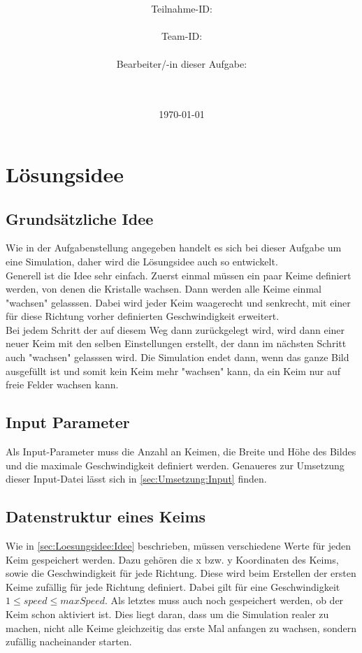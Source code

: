 \documentclass[a4paper,10pt,ngerman]{scrartcl}
\title{\textbf{\Huge\Aufgabe}}
\author{\LARGE Teilnahme-ID: \LARGE \TeilnahmeId \\\\
      \LARGE Team-ID: \LARGE \TeamId \\\\
	    \LARGE Bearbeiter/-in dieser Aufgabe: \\ 
	    \LARGE \Name\\\\}
\date{\LARGE\today}
\begin{document}
  \maketitle
  \tableofcontents
  \vspace{8cm}
  \section{Lösungsidee\label{sec:Loesungsidee}}
    \subsection{Grundsätzliche Idee\label{sec:Loesungsidee:Idee}}
      Wie in der Aufgabenstellung angegeben handelt es sich bei dieser Aufgabe um eine Simulation, daher wird die Lösungsidee auch so entwickelt.\\
      Generell ist die Idee sehr einfach. Zuerst einmal müssen ein paar Keime definiert werden, von denen die Kristalle wachsen. Dann werden alle Keime einmal "wachsen" gelasssen. Dabei wird jeder Keim waagerecht und senkrecht, mit einer für diese Richtung vorher definierten Geschwindigkeit erweitert. \\
      Bei jedem Schritt der auf diesem Weg dann zurückgelegt wird, wird dann einer neuer Keim mit den selben Einstellungen erstellt, der dann im nächsten Schritt auch "wachsen" gelasssen wird. Die Simulation endet dann, wenn das ganze Bild ausgefüllt ist und somit kein Keim mehr "wachsen" kann, da ein Keim nur auf freie Felder wachsen kann.
    \subsection{Input Parameter\label{sec:Loesungsidee:Parameter}}
      Als Input-Parameter muss die Anzahl an Keimen, die Breite und Höhe des Bildes und die maximale Geschwindigkeit definiert werden. Genaueres zur Umsetzung dieser Input-Datei lässt sich in \cref{sec:Umsetzung:Input} finden.
    \subsection{Datenstruktur eines Keims}  
      Wie in \cref{sec:Loesungsidee:Idee} beschrieben, müssen verschiedene Werte für jeden Keim gespeichert werden. Dazu gehören die x bzw. y Koordinaten des Keims, sowie die Geschwindigkeit für jede Richtung. Diese wird beim Erstellen der ersten Keime zufällig für jede Richtung definiert. Dabei gilt für eine Geschwindigkeit $1 \leq speed \leq maxSpeed$. Als letztes muss auch noch gespeichert werden, ob der Keim schon aktiviert ist. Dies liegt daran, dass um die Simulation realer zu machen, nicht alle Keime gleichzeitig das erste Mal anfangen zu wachsen, sondern zufällig nacheinander starten.
\end{document}

